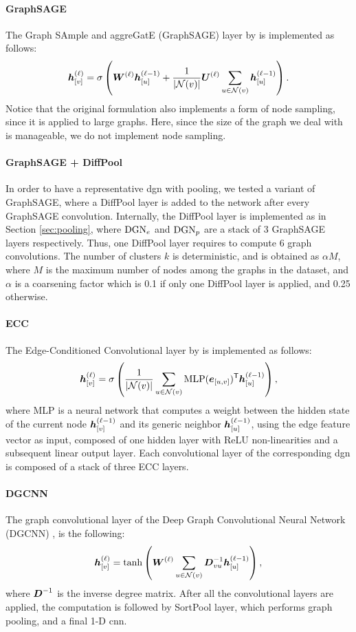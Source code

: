 \paragraph{GraphSAGE}
The Graph SAmple and aggreGatE (GraphSAGE) layer by \cite{hamilton2017graphsage} is implemented as follows:
$$\StateVector{v}{\ell} = \sigma\Par{\LayerMatrix{w}{\ell}\StateVector{u}{\ell-1} + \frac{1}{|\Neigh(v)|} \LayerMatrix{U}{\ell} \sum_{u \in \Neigh(v)} \StateVector{u}{\ell-1}}.$$
Notice that the original formulation also implements a form of node sampling, since it is applied to large graphs. Here, since the size of the graph we deal with is manageable, we do not implement node sampling.

\paragraph{GraphSAGE + DiffPool}
In order to have a representative \gls{dgn} with pooling, we tested a variant of GraphSAGE, where a DiffPool layer is added to the network after every GraphSAGE convolution. Internally, the DiffPool layer is implemented as in Section \ref{sec:pooling}, where $\mathrm{DGN}_e$ and $\mathrm{DGN}_p$ are a stack of 3 GraphSAGE layers respectively. Thus, one DiffPool layer requires to compute 6 graph convolutions. The number of clusters $k$ is deterministic, and is obtained as $\alpha M$, where $M$ is the maximum number of nodes among the graphs in the dataset, and $\alpha$ is a coarsening factor which is 0.1 if only one DiffPool layer is applied, and 0.25 otherwise.

\paragraph{ECC}
The Edge-Conditioned Convolutional layer by \cite{simonovsky2017ecc} is implemented as follows:
$$\StateVector{v}{\ell} = \sigma\Par{ \frac{1}{|\Neigh(v)|}\sum_{u \in \Neigh(v)} \Fun{MLP}(\Elem{e}{u,v})^{\Transpose} \StateVector{u}{\ell-1}},$$
where MLP is a neural network that computes a weight between the hidden state of the current node $\Elem{h}{v}^{(\ell-1)}$ and its generic neighbor $\StateVector{u}{\ell-1}$, using the edge feature vector as input, composed of one hidden layer with ReLU non-linearities and a subsequent linear output layer. Each convolutional layer of the corresponding \gls{dgn} is composed of a stack of three ECC layers.

\paragraph{DGCNN}
The graph convolutional layer of the Deep Graph Convolutional Neural Network (DGCNN) \citep{zhang2018dgcnn}, is the following:
$$\StateVector{v}{\ell} = \Fun{tanh} \Par{\LayerMatrix{w}{\ell} \sum_{u \in \Neigh(v)} \Matrix{D}^{-1}_{vu}\StateVector{u}{\ell-1}},$$
where $\Matrix{D}^{-1}$ is the inverse degree matrix. After all the convolutional layers are applied, the computation is followed by SortPool layer, which performs graph pooling, and a final 1-D \gls{cnn}.

